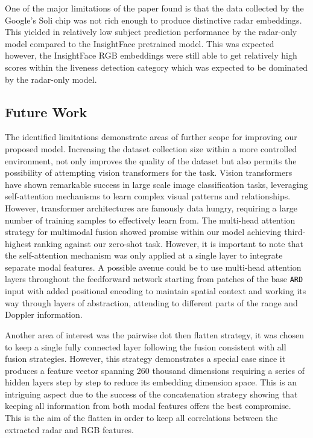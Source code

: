 \documentclass{mpaper}
\begin{document}
One of the major limitations of the paper found is that the data collected by the Google's Soli chip was not rich enough to produce distinctive radar embeddings. This yielded in relatively low subject prediction performance by the radar-only model compared to the InsightFace pretrained model. This was expected however, the InsightFace RGB embeddings were still able to get relatively high scores within the liveness detection category which was expected to be dominated by the radar-only model. 

\subsection{Future Work}
The identified limitations demonstrate areas of further scope for improving our proposed model. Increasing the dataset collection size within a more controlled environment, not only improves the quality of the dataset but also permits the possibility of attempting vision transformers for the task. Vision transformers have shown remarkable success in large scale image classification tasks, leveraging self-attention mechanisms to learn complex visual patterns and relationships. However, transformer architectures are famously data hungry, requiring a large number of training samples to effectively learn from. The multi-head attention strategy for multimodal fusion showed promise within our model achieving third-highest ranking against our zero-shot task. However, it is important to note that the self-attention mechanism was only applied at a single layer to integrate separate modal features. A possible avenue could be to use multi-head attention layers throughout the feedforward network starting from patches of the base \texttt{ARD} input with added positional encoding to maintain spatial context and working its way through layers of abstraction, attending to different parts of the range and Doppler information.

Another area of interest was the pairwise dot then flatten strategy, it was chosen to keep a single fully connected layer following the fusion consistent with all fusion strategies. However, this strategy demonstrates a special case since it produces a feature vector spanning 260 thousand dimensions requiring a series of hidden layers step by step to reduce its embedding dimension space. This is an intriguing aspect due to the success of the concatenation strategy showing that keeping all information from both modal features offers the best compromise. This is the aim of the flatten in order to keep all correlations between the extracted radar and RGB features.
\end{document}
